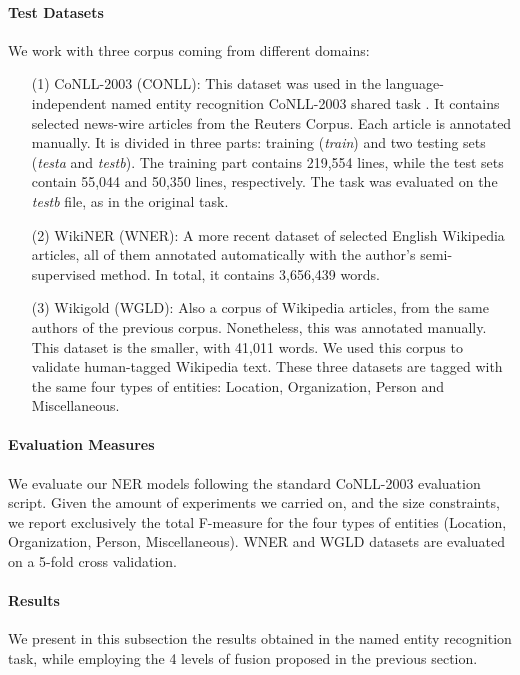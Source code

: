 \paragraph{Test Datasets}We work with three corpus coming from different domains:
\begin{itemize}
\item [(1)] CoNLL-2003 (CONLL): This dataset was used in the language-independent named entity recognition CoNLL-2003 shared task \cite{SangM03}. It contains selected news-wire articles from the Reuters Corpus. Each article is annotated manually. It is divided in three parts:  training (\textit{train}) and two testing sets (\textit{testa} and \textit{testb}). The training part contains 219,554 lines, while the test sets contain 55,044 and 50,350 lines, respectively. The task was evaluated on the \textit{testb} file, as in the original task.
\item [(2)]WikiNER (WNER): A more recent dataset \cite{Balasuriya2009} of selected English \allowbreak Wikipedia articles, all of them annotated automatically with the author's semi-supervised \allowbreak method. In total, it contains 3,656,439 words. 
\item[(3)] Wikigold (WGLD): Also a corpus of Wikipedia articles, from the same authors of the previous corpus. Nonetheless, this was annotated manually. This dataset is the smaller, with 41,011 words. We used this corpus to validate human-tagged Wikipedia text. These three datasets are tagged with the same four types of entities: Location, Organization, Person and Miscellaneous.


\end{itemize}
%
\paragraph{Evaluation Measures}
We evaluate our NER models following the standard CoNLL-2003 evaluation script. Given the amount of experiments we carried on, and the size constraints, we report exclusively the total F-measure for the four types of entities (Location, Organization, Person, Miscellaneous). WNER and WGLD datasets are evaluated on a 5-fold cross validation.

\paragraph{Results}
We present in this subsection the results obtained in the named entity recognition task, while employing the 4 levels of fusion proposed in the previous section.

